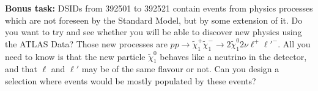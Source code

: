 \textbf{Bonus task:} DSIDs from 392501 to 392521 contain events from physics processes which are not foreseen by the Standard Model, but by some extension of it. Do you want to try and see whether you will be able to discover new physics using the ATLAS Data? Those new processes are $pp\rightarrow \tilde{\chi}^+_1  \tilde{\chi}^-_1 \rightarrow 2\tilde{\chi}^0_1 2\nu \ell^+\ell'^-$. All you need to know is that the new particle $\tilde{\chi}^0_1$ behaves like a neutrino in the detector, and that $\ell$ and $\ell'$ may be of the same flavour or not. Can you design a selection where events would be mostly populated by these events? 



